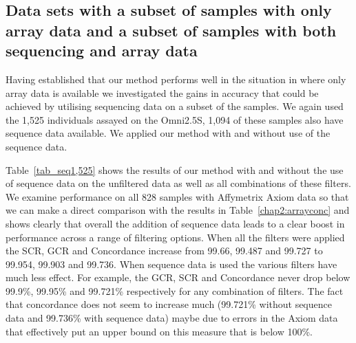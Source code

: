 \clearpage

\subsection{Data sets with a subset of samples with only array data and a subset of samples with both sequencing and array data} 

Having established that our method performs well in the situation in where only array data is available we investigated the gains in accuracy that could be achieved by utilising sequencing data on a subset of the samples. We again used the 1,525 individuals assayed on the Omni2.5S, 1,094 of these samples also have sequence data available. We applied our method with and without use of the sequence data. 

Table~\ref{tab_seq1,525}  shows the results of our method with and without the use of sequence data on the unfiltered data as well as all combinations of these filters. We examine performance on all 828 samples with Affymetrix Axiom data so that we can make a direct comparison with the results in Table~\ref{chap2:arrayconc} and shows clearly that overall the addition of sequence data leads to a clear boost in performance across a range of filtering options. When all the filters were applied the SCR, GCR and Concordance increase from 99.66, 99.487 and 99.727 to 99.954, 99.903 and 99.736. When sequence data is used the various filters have much less effect. For example, the GCR, SCR and Concordance never drop below 99.9\%, 99.95\% and 99.721\% respectively for any combination of filters. The fact that concordance does not seem to increase much (99.721\% without sequence data and 99.736\% with sequence data) maybe due to errors in the Axiom data that effectively put an upper bound on this measure that is below 100\%. 

